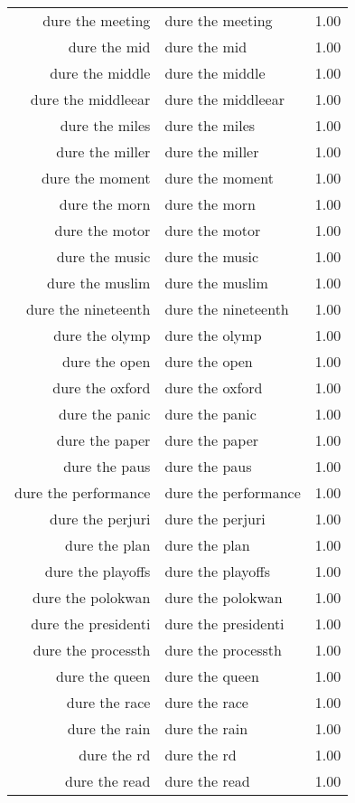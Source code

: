 \begin{table}[ht]
\begin{tabular}{rlr}
  dure the meeting & dure the meeting & 1.00 \\ 
  dure the mid & dure the mid & 1.00 \\ 
  dure the middle & dure the middle & 1.00 \\ 
  dure the middleear & dure the middleear & 1.00 \\ 
  dure the miles & dure the miles & 1.00 \\ 
  dure the miller & dure the miller & 1.00 \\ 
  dure the moment & dure the moment & 1.00 \\ 
  dure the morn & dure the morn & 1.00 \\ 
  dure the motor & dure the motor & 1.00 \\ 
  dure the music & dure the music & 1.00 \\ 
  dure the muslim & dure the muslim & 1.00 \\ 
  dure the nineteenth & dure the nineteenth & 1.00 \\ 
  dure the olymp & dure the olymp & 1.00 \\ 
  dure the open & dure the open & 1.00 \\ 
  dure the oxford & dure the oxford & 1.00 \\ 
  dure the panic & dure the panic & 1.00 \\ 
  dure the paper & dure the paper & 1.00 \\ 
  dure the paus & dure the paus & 1.00 \\ 
  dure the performance & dure the performance & 1.00 \\ 
  dure the perjuri & dure the perjuri & 1.00 \\ 
  dure the plan & dure the plan & 1.00 \\ 
  dure the playoffs & dure the playoffs & 1.00 \\ 
  dure the polokwan & dure the polokwan & 1.00 \\ 
  dure the presidenti & dure the presidenti & 1.00 \\ 
  dure the processth & dure the processth & 1.00 \\ 
  dure the queen & dure the queen & 1.00 \\ 
  dure the race & dure the race & 1.00 \\ 
  dure the rain & dure the rain & 1.00 \\ 
  dure the rd & dure the rd & 1.00 \\ 
  dure the read & dure the read & 1.00 \\ 

\end{tabular}
\end{table}
